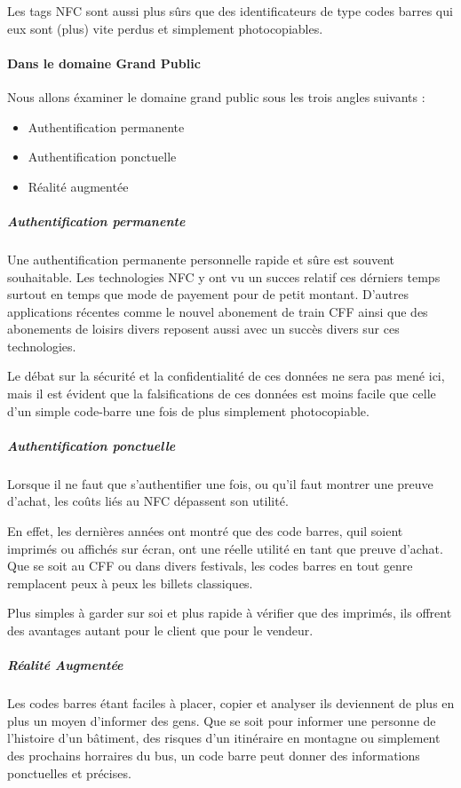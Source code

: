 \documentclass[a4paper,11pt,titlepage]{article}
\begin{document}
Les tags NFC sont aussi plus sûrs que des identificateurs de type codes barres qui eux sont (plus) vite perdus et simplement photocopiables.

\paragraph{Dans le domaine Grand Public}

Nous allons éxaminer le domaine grand public sous les trois angles suivants :

\begin{itemize}
\item Authentification permanente
\item Authentification ponctuelle
\item Réalité augmentée
\end{itemize}

\subparagraph{Authentification permanente}

Une authentification permanente personnelle rapide et sûre est souvent souhaitable.
Les technologies NFC y ont vu un succes relatif ces dérniers temps surtout en temps que mode de payement pour de petit montant.
D'autres applications récentes comme le nouvel abonement de train CFF ainsi que des abonements de loisirs divers reposent aussi avec un succès divers sur ces technologies.

Le débat sur la sécurité et la confidentialité de ces données ne sera pas mené ici, mais il est évident que la falsifications de ces données est moins facile que celle d'un simple code-barre une fois de plus simplement photocopiable.

\subparagraph{Authentification ponctuelle}

Lorsque il ne faut que s'authentifier une fois, ou qu'il faut montrer une preuve d'achat, les coûts liés au NFC dépassent son utilité.

En effet, les dernières années ont montré que des code barres, quil soient imprimés ou affichés sur écran, ont une réelle utilité en tant que preuve d'achat.
Que se soit au CFF ou dans divers festivals, les codes barres en tout genre remplacent peux à peux les billets classiques.

Plus simples à garder sur soi et plus rapide à vérifier que des imprimés, ils offrent des avantages autant pour le client que pour le vendeur.

\subparagraph{Réalité Augmentée}

Les codes barres étant faciles à placer, copier et analyser ils deviennent de plus en plus un moyen d'informer des gens.
Que se soit pour informer une personne de l'histoire d'un bâtiment, des risques d'un itinéraire en montagne ou simplement des prochains horraires du bus, un code barre peut donner des informations ponctuelles et précises.
\end{document}
